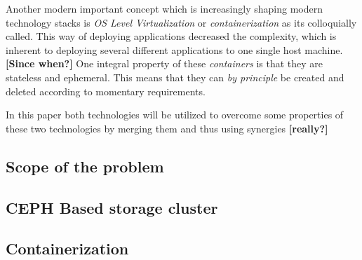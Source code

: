 \documentclass[titlepage, a4paper, 11pt]{scrartcl}
\begin{document}
        \bigskip

        Another modern important concept which is increasingly shaping modern technology stacks is \textit{OS Level Virtualization} or
        \textit{containerization} as its colloquially called. This way of deploying applications decreased the complexity, which is
        inherent to deploying several different applications to one single host machine. \textbf{[Since when?]}
        One integral property of these \textit{containers} is that they are stateless and ephemeral. This means that they can 
        \textit{by principle} be created and deleted according to momentary requirements. 

        \bigskip

        In this paper both technologies will be utilized to overcome some properties of these two technologies by merging them 
        and thus using synergies \textbf{[really?]}


        \subsection{Scope of the problem}



 


        \subsection{CEPH Based storage cluster}


        \subsection{Containerization}
\end{document}
